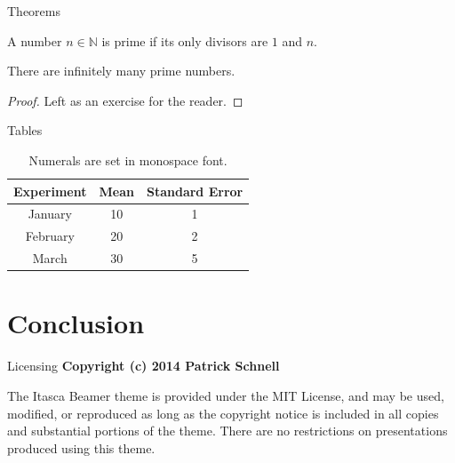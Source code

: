 \documentclass{beamer}
\begin{document}
\begin{frame}{Theorems}
	\begin{definition}
		A number $n \in \mathbb{N}$ is prime if its only divisors are $1$ and $n$.
	\end{definition}

	\begin{theorem}[Euclid]
		There are infinitely many prime numbers.
	\end{theorem}

	\begin{proof}
		Left as an exercise for the reader.
	\end{proof}

\end{frame}

\begin{frame}{Tables}
	\begin{table}
		\begin{tabular}{ccc}
		\toprule
		Experiment & Mean & Standard Error \\
		\midrule
		January & 10 & 1 \\
		February & 20 & 2 \\
		March & 30 & 5 \\
		\bottomrule
		\end{tabular}

		\caption{Numerals are set in monospace font.}
	\end{table}
\end{frame}

\section{Conclusion}

\sectionpage

\begin{frame}{Licensing}
\textbf{Copyright (c) 2014 Patrick Schnell}

The Itasca Beamer theme is provided under the MIT License, and may be used, modified, or reproduced as long as the copyright notice is included in all copies and substantial portions of the theme.
There are no restrictions on presentations produced using this theme.
\end{frame}
\end{document}
